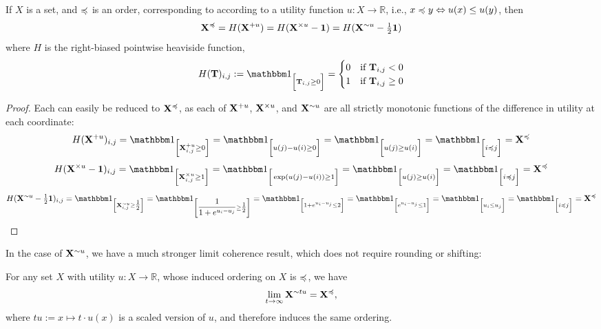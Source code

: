 \documentclass{article}
\begin{document}
	\begin{prop}
		If $X$ is a set, and $\preccurlyeq$ is an order, corresponding to according to a utility function $u : X \to \mathbb R$, i.e., $x \preccurlyeq y \Leftrightarrow u(x) \leq u(y)$, then 
		\[
			\mathbf X^\preccurlyeq = H(\mathbf X^{+u} ) 
	 		 = H(\mathbf X^{\times u} - \mathbf 1)
	 		 = H(\mathbf X^{\sim u} - \tfrac{1}{2}\mathbf 1)
		\]
		where $H$ is the right-biased pointwise heaviside function, 
		\[H(\mat T)_{i,j} := \indi{\mat T_{i,j} \geq 0} = \begin{cases} 0 & \text{if}~\mat T_{i,j} < 0 \\ 1 & \text{if}~\mat T_{i,j} \geq 0\end{cases}\]
	\end{prop}
	\begin{proof} Each can easily be reduced to $\mathbf X^\preccurlyeq$, as each of $\mathbf X^{+u}$, $\mathbf X^{\times u}$, and $\mathbf X^{\sim u}$ are all strictly monotonic functions of the difference in utility at each coordinate:
		\begin{equation*}
			H(\mat X^{+u} )_{i,j} = \indi{\mat X^{+u}_{i,j} \geq 0} = \indi{u(j) - u(i) \geq 0} = \indi{u(j) \geq u(i)} = \indi{i \leqc j} = \mat X^\leqc 
		\end{equation*}
		\begin{equation*}
			H(\mat X^{\times u} - \mat 1)_{i,j} = \indi{\mat X^{\times u}_{i,j} \geq 1} = \indi{\exp(u(j) - u(i)) \geq 1} = \indi{u(j) \geq u(i)} = \indi{i \leqc j} = \mat X^\leqc 
		\end{equation*}
		\begin{equation*}
		H(\mat X^{\sim u} -\tfrac{1}{2} \mat 1)_{i,j} = \indi{ \mat X^{\sim u}_{i,j} \geq \tfrac{1}{2}} = \indi{\dfrac{1}{1 + e^{u_i - u_j}} \geq \tfrac{1}{2}} 	
			= \indi{1 + e^{u_i - u_j} \leq 2}= \indi{e^{u_i - u_j} \leq 1} = \indi{u_i \leq u_j} = \indi{i \leqc j} = \mat X^\leqc 
		\end{equation*}
	\end{proof}

	In the case of $\mathbf X^{\sim u}$, we have a much stronger limit coherence result, which does not require rounding or shifting:
	\begin{prop} For any set $X$ with utility $u : X \to \mathbb R$, whose induced ordering on $X$ is $\preccurlyeq$, we have
		\[ \lim\limits_{t \to \infty} \mathbf X^{\sim t u} = \mathbf X^\preccurlyeq, \]
	where $tu := x \mapsto t\cdot u(x)$ is a scaled version of $u$, and therefore induces the same ordering.
	\end{prop}
\end{document}
